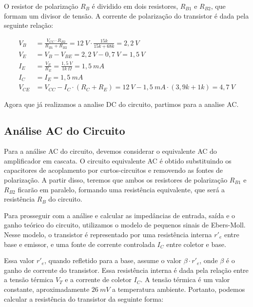 O resistor de polarização $R_B$ é dividido em dois resistores, $R_{B1}$ e $R_{B2}$, que formam um divisor de tensão. A corrente de polarização do transistor é dada pela seguinte relação:

\begin{align}
    V_B &= \frac{V_{CC} \cdot R_{B2}}{R_{B1} + R_{B2}} = 12~V \cdot \frac{15k}{15k + 68k} = 2,2~V \\
    V_E &= V_B - V_{BE} = 2,2~V - 0,7~V = 1,5~V \\
    I_E &= \frac{V_E}{R_E} = \frac{1,5~V}{1k~\Omega} = 1,5~mA \\
    I_C &= I_E = 1,5~mA \\
    V_{CE} &= V_{CC} - I_C \cdot (R_C + R_E) = 12~V - 1,5~mA \cdot (3,9k + 1k) = 4,7~V
\end{align}

Agora que já realizamos a analise DC do circuito, partimos para a analise AC.

\subsection{Análise AC do Circuito}

Para a análise AC do circuito, devemos considerar o equivalente AC do amplificador em cascata. O circuito equivalente AC é obtido substituindo os capacitores de acoplamento por curtos-circuitos e removendo as fontes de polarização. A partir disso, teremos que ambos os resistores de polarização $R_{B1}$ e $R_{B2}$ ficarão em paralelo, formando uma resistência equivalente, que será a resistência $R_B$ do circuito.


Para prosseguir com a análise e calcular as impedâncias de entrada, saída e o ganho teórico do circuito, utilizamos o modelo de pequenos sinais de Ebers-Moll. Nesse modelo, o transistor é representado por uma resistência interna $r'_e$ entre base e emissor, e uma fonte de corrente controlada $I_C$ entre coletor e base.

Essa valor $r'_e$, quando refletido para a base, assume o valor $\beta \cdot r'_e$, onde $\beta$ é o ganho de corrente do transistor. Essa resistência interna é dada pela relação entre a tensão térmica $V_T$ e a corrente de coletor $I_C$. A tensão térmica é um valor constante, aproximadamente $26~mV$ a temperatura ambiente. Portanto, podemos calcular a resistência do transistor da seguinte forma:

